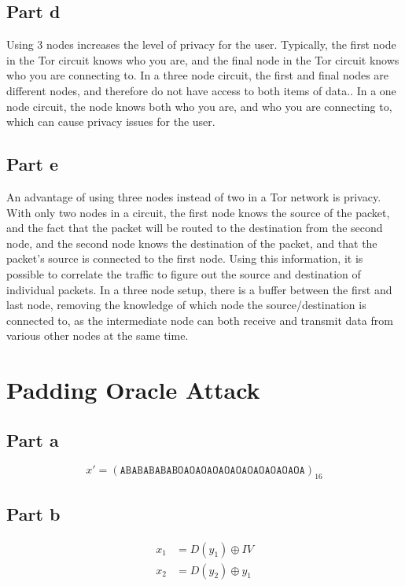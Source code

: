 \documentclass[12pt,a4paper]{article}
\begin{document}
\subsection{Part d}
Using 3 nodes increases the level of privacy for the user. Typically, the first node in the Tor circuit knows who you are, and the final node in the Tor circuit knows who you are connecting to. In a three node circuit, the first and final nodes are different nodes, and therefore do not have access to both items of data.. In a one node circuit, the node knows both who you are, and who you are connecting to, which can cause privacy issues for the user.

\subsection{Part e}
An advantage of using three nodes instead of two in a Tor network is privacy. With only two nodes in a circuit, the first node knows the source of the packet, and the fact that the packet will be routed to the destination from the second node, and the second node knows the destination of the packet, and that the packet's source is connected to the first node. Using this information, it is possible to correlate the traffic to figure out the source and destination of individual packets. In a three node setup, there is a buffer between the first and last node, removing the knowledge of which node the source/destination is connected to, as the intermediate node can both receive and transmit data from various other nodes at the same time.

\section{Padding Oracle Attack}
\subsection{Part a}
\[
  x' = (\mathtt{ABABABABABOAOAOAOAOAOAOAOAOAOAOA})_{16}
\]

\subsection{Part b}
\begin{align*}
  x_1 &= D(y_1) \oplus IV \\
  x_2 &= D(y_2) \oplus y_1
\end{align*}
\end{document}
